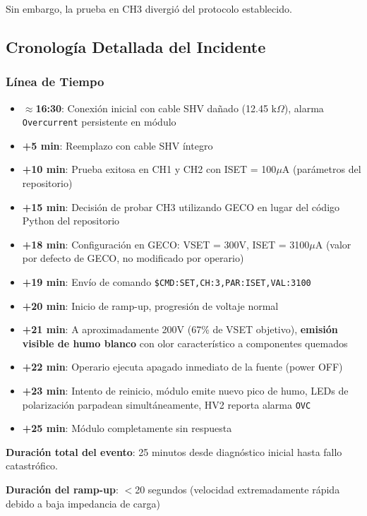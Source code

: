 \documentclass{article}
\begin{document}
Sin embargo, la prueba en CH3 divergió del protocolo establecido.

\subsection{Cronología Detallada del Incidente}

\subsubsection{Línea de Tiempo}

\begin{itemize}
    \item \textbf{$\approx$16:30}: Conexión inicial con cable SHV dañado (12.45 k\(\Omega\)), alarma \texttt{Overcurrent} persistente en módulo
    \item \textbf{+5 min}: Reemplazo con cable SHV íntegro
    \item \textbf{+10 min}: Prueba exitosa en CH1 y CH2 con ISET = 100\(\mu\)A (parámetros del repositorio)
    \item \textbf{+15 min}: Decisión de probar CH3 utilizando GECO en lugar del código Python del repositorio
    \item \textbf{+18 min}: Configuración en GECO: VSET = 300V, ISET = 3100\(\mu\)A (valor por defecto de GECO, no modificado por operario)
    \item \textbf{+19 min}: Envío de comando \texttt{\$CMD:SET,CH:3,PAR:ISET,VAL:3100}
    \item \textbf{+20 min}: Inicio de ramp-up, progresión de voltaje normal
    \item \textbf{+21 min}: A aproximadamente 200V (67\% de VSET objetivo), \textbf{emisión visible de humo blanco} con olor característico a componentes quemados
    \item \textbf{+22 min}: Operario ejecuta apagado inmediato de la fuente (power OFF)
    \item \textbf{+23 min}: Intento de reinicio, módulo emite nuevo pico de humo, LEDs de polarización parpadean simultáneamente, HV2 reporta alarma \texttt{OVC}
    \item \textbf{+25 min}: Módulo completamente sin respuesta
\end{itemize}

\textbf{Duración total del evento}: 25 minutos desde diagnóstico inicial hasta fallo catastrófico.

\textbf{Duración del ramp-up}: $<$20 segundos (velocidad extremadamente rápida debido a baja impedancia de carga)
\end{document}
